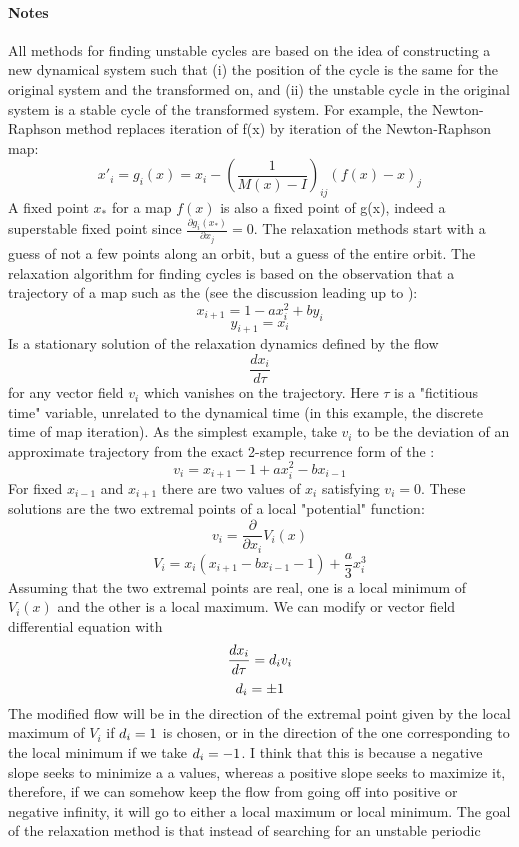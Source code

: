 \begin{description}
\paragraph{Notes}
All methods for finding unstable cycles are based on the idea of
constructing a new dynamical system such that (i) the position of the
cycle is the same for the original system and the transformed on, and
(ii) the unstable cycle in the original system is a stable cycle of the
transformed system. For example, the Newton-Raphson method replaces
iteration of f(x) by iteration of the Newton-Raphson map:
$$x'_i=g_i(x)=x_i-\left(\frac{1}{M(x)-I}\right)_{ij}(f(x)-x)_j$$ A fixed
point $x_*$ for a map $f(x)$ is also a fixed point of g(x), indeed a
superstable fixed point since $\frac{\partial g_i(x_*)}{\partial x_j}=0$.
The relaxation methods start with a guess of not a few points along an
orbit, but a guess of the entire orbit. The relaxation algorithm for
finding cycles is based on the observation that a trajectory of a map
such as the {\HenonMap} (see the discussion leading up to
):
$$x_{i+1}=1-ax_i^2+by_i$$
$$y_{i+1}=x_i$$
Is a stationary solution of the relaxation dynamics defined by the flow
$$\frac{dx_i}{d\tau}$$
for any vector field $v_i$ which vanishes on the trajectory. Here $\tau$
is a "fictitious time" variable, unrelated to the dynamical time (in this
example, the discrete time of map iteration). As the simplest example,
take $v_i$ to be the deviation of an approximate trajectory from the
exact 2-step recurrence form of the {\HenonMap}:
$$v_i=x_{i+1}-1+ax_i^2-bx_{i-1}$$
For fixed $x_{i-1}$ and $x_{i+1}$ there are two values of $x_i$
satisfying $v_i=0$. These solutions are the two extremal points of a
local "potential" function:
$$v_i=\frac{\partial}{\partial x_i}V_i(x)$$
$$V_i=x_i(x_{i+1}-bx_{i-1}-1)+\frac{a}{3}x_i^3$$
Assuming that the two extremal points are real, one is a local minimum of
$V_i(x)$ and the other is a local maximum. We can modify or vector field
differential equation with
$$\frac{dx_i}{d\tau}=d_iv_i$$
$$d_i=\pm 1$$
The modified flow will be in the direction of the extremal point given by
the local maximum of $V_i$ if $d_i=1$ is chosen, or in the direction
of the one corresponding to the local minimum if we take $d_i=-1$. I
think that this is because a negative slope seeks to minimize a a values,
whereas a positive slope seeks to maximize it, therefore, if we can
somehow keep the flow from going off into positive or negative infinity,
it will go to either a local maximum or local minimum. The goal of the
relaxation method is that instead of searching for an unstable periodic

\end{description}
